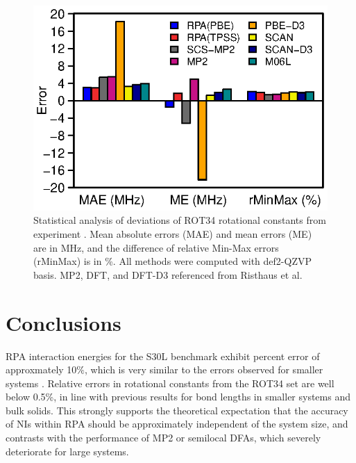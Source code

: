 \documentclass[twoside,twocolumn,9pt]{article}
\begin{document}
\begin{figure}[h]
  \centering
  \includegraphics[scale=0.24]{deviate_v4}
  \caption{Statistical analysis of deviations of ROT34 rotational
    constants from experiment
    \cite{Risthaus13JChemTheoryComput9p1580}. Mean absolute errors (MAE)
    and mean errors (ME) are in MHz, and the difference of relative Min-Max errors
    (rMinMax) is in \%. All methods were computed
    with def2-QZVP basis. MP2, DFT, and DFT-D3 referenced from Risthaus et
    al\cite{Risthaus13JChemTheoryComput9p1580}.
}
  \label{fig:methods_bar}
\end{figure}

\section{Conclusions}

RPA interaction energies for the S30L benchmark exhibit percent error
of approxmately 10$\%$, which is very similar to the errors observed 
for smaller systems \cite{Eshuis11JPhysChemLett2p983}. Relative errors
in rotational constants from the ROT34 set are well below 0.5\%, in line
with previous results for bond lengths in smaller systems
\cite{Burow14JChemTheoryComput10p180,Chen17AnnuRevPhysChem68p421} and
bulk solids.\cite{Harl09PhysRevLett103p056401, Harl10PhysRevB81p115126}
This strongly supports the theoretical expectation that the accuracy of NIs
within RPA should be approximately independent of the system size, and 
contrasts with the performance of MP2 or semilocal DFAs, which severely
deteriorate for large systems. 
\end{document}

